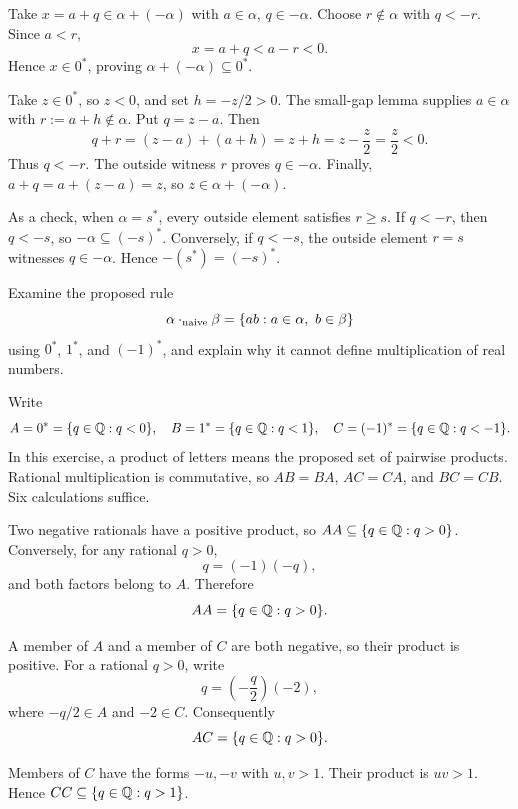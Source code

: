 Take $x=a+q\in\alpha+(-\alpha)$ with $a\in\alpha$, $q\in-\alpha$.
Choose $r\notin\alpha$ with $q<-r$. Since $a<r$,
\[
 x=a+q<a-r<0.
\]
Hence $x\in0^*$, proving $\alpha+(-\alpha)\subseteq0^*$.

Take $z\in0^*$, so $z<0$, and set $h=-z/2>0$.
The small-gap lemma supplies $a\in\alpha$ with $r:=a+h\notin\alpha$.
Put $q=z-a$. Then
\[
 q+r=(z-a)+(a+h)=z+h=z-\frac z2=\frac z2<0.
\]
Thus $q<-r$. The outside witness $r$ proves $q\in-\alpha$.
Finally, $a+q=a+(z-a)=z$, so $z\in\alpha+(-\alpha)$.


As a check, when $\alpha=s^*$, every outside element satisfies $r\ge s$.
If $q<-r$, then $q<-s$, so $-\alpha\subseteq(-s)^*$.
Conversely, if $q<-s$, the outside element $r=s$ witnesses
$q\in-\alpha$. Hence $-(s^*)=(-s)^*$.


\goal Examine the proposed rule
\[
 \alpha\mathbin{\cdot_{\rm naive}}\beta
   =\{ab:a\in\alpha,\ b\in\beta\}
\]
using $0^*$, $1^*$, and $(-1)^*$, and explain why it cannot define
multiplication of real numbers.

Write
\[
 A=0^*=\{q\in\mathbb{Q}:q<0\},\quad
 B=1^*=\{q\in\mathbb{Q}:q<1\},\quad
 C=(-1)^*=\{q\in\mathbb{Q}:q<-1\}.
\]
In this exercise, a product of letters means the proposed set of
pairwise products. Rational multiplication is commutative, so
$AB=BA$, $AC=CA$, and $BC=CB$. Six calculations suffice.

Two negative rationals have a positive product, so
$AA\subseteq\{q\in\mathbb{Q}:q>0\}$. Conversely, for any rational $q>0$,
\[
 q=(-1)(-q),
\]
and both factors belong to $A$. Therefore
\[
 AA=\{q\in\mathbb{Q}:q>0\}.
\]

A member of $A$ and a member of $C$ are both negative, so their
product is positive. For a rational $q>0$, write
\[
 q=\left(-\frac q2\right)(-2),
\]
where $-q/2\in A$ and $-2\in C$. Consequently
\[
 AC=\{q\in\mathbb{Q}:q>0\}.
\]

Members of $C$ have the forms $-u,-v$ with $u,v>1$.
Their product is $uv>1$. Hence $CC\subseteq\{q\in\mathbb{Q}:q>1\}$.

